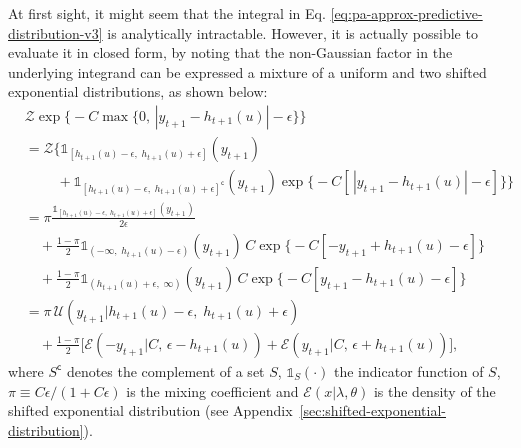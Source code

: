 At first sight, it might seem that the integral in Eq. \eqref{eq:pa-approx-predictive-distribution-v3} is analytically intractable. However, it is actually possible to evaluate it in closed form, by noting that the non-Gaussian factor in the underlying integrand can be expressed a mixture of a uniform and two shifted exponential distributions, as shown below:
\begin{align}
	& \mathcal{Z}\exp\Big\{-C\max\big\{0,\, |y_{t+1} - h_{t+1}(u)|-\epsilon\big\}\Big\}
	\nonumber \\	
	&= \mathcal{Z}\Big\{\mathds{1}_{[h_{t+1}(u)-\epsilon,\; h_{t+1}(u)+\epsilon]}(y_{t+1})
	\nonumber \\
	& \qquad\; + \mathds{1}_{[h_{t+1}(u)-\epsilon,\; h_{t+1}(u)+\epsilon]^\mathsf{c}}(y_{t+1})\exp\big\{-C[\,|y_{t+1} - h_{t+1}(u)|-\epsilon]\big\}\Big\}
	\nonumber \\
	&= \pi\frac{\mathds{1}_{[h_{t+1}(u)-\epsilon,\; h_{t+1}(u)+\epsilon]}(y_{t+1})}{2\epsilon}
	\nonumber \\
	& \quad + \frac{1-\pi}{2}\mathds{1}_{(-\infty,\; h_{t+1}(u)-\epsilon)}(y_{t+1})\,C\exp\big\{-C[-y_{t+1} + h_{t+1}(u) -\epsilon]\big\}
	\nonumber \\
	& \quad + \frac{1-\pi}{2}\mathds{1}_{(h_{t+1}(u)+\epsilon,\; \infty)}(y_{t+1})\,C\exp\big\{-C[y_{t+1} - h_{t+1}(u) -\epsilon]\big\}
	\label{eq:ilf-likelihood-mixture-rep-v2} \\
	&= \pi\,\mathcal{U}(y_{t+1}|h_{t+1}(u)-\epsilon,\; h_{t+1}(u)+\epsilon)
	\nonumber \\
	& \quad + \frac{1-\pi}{2}\big[\mathcal{E}(-y_{t+1}|C,\, \epsilon - h_{t+1}(u)) + \mathcal{E}(y_{t+1}|C,\, \epsilon + h_{t+1}(u))\big],
	\label{eq:ilf-likelihood-mixture-rep-v3}
\end{align}
where $S^\mathsf{c}$ denotes the complement of a set $S$, $\mathds{1}_{S}(\cdot)$ the indicator function of $S$, $\pi \equiv C\epsilon/(1+C\epsilon)$ is the mixing coefficient and $\mathcal{E}(x|\lambda, \theta)$ is the density of the shifted exponential distribution (see Appendix~\ref{sec:shifted-exponential-distribution}).

